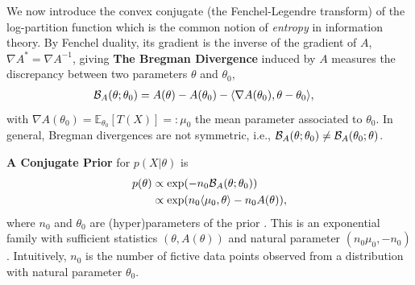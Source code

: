 \documentclass[twoside]{article}
\newcommand*{\expect}[2][]{\ensuremath{\mathbb{E}_{#1} \left[ #2 \right] }} %
\newcommand{\logpart}{A}
\newcommand{\conj}{{\logpart^*}}
\newcommand{\bregman}{\cB_\logpart}
\newcommand{\bregmanconj}{\cB_{\logpart^*}}
\newcommand{\nat}{\theta}
\newcommand{\m}{\mu}
\newcommand{\meanp}{\m}
\begin{document}
We now introduce the convex conjugate (the Fenchel-Legendre transform) of the log-partition function
\aligns{
	\conj(\m) =  \langle \m, \nat \rangle - \logpart(\nat)
	=  \max_{\nat'\in\Theta}  \langle \m, \nat' \rangle - \logpart(\nat')\; ,
}
which is the common notion of \textit{entropy} in information theory.
By Fenchel duality, its gradient is the inverse of the gradient of $\logpart$,  $\nabla\conj=\nabla\logpart^{-1}$, giving
\aligns{
	\nabla\conj \circ \nabla\logpart(\nat) = \nat, \quad \nabla\logpart\circ \nabla\conj(\meanp) = \meanp.
}
%
{\bf The Bregman Divergence} induced by $\logpart$ measures the discrepancy between two parameters $\nat$ and $\nat_0$,
\begin{align}
    \bregman (\nat ; \nat_0)
    & = \logpart(\nat) - \logpart(\nat_0)
    - \langle \nabla \logpart(\nat_0)  , \nat - \nat_0 \rangle,
    \label{eq:defBregman}
\end{align}
with $\nabla \logpart(\nat_0) = \expect[\nat_0]{T(X)} =: \meanp_0$ the mean parameter associated to $\nat_0$.
In general, Bregman divergences are not symmetric, i.e., $\bregman (\nat ; \nat_0)\neq \bregman (\nat_0 ; \nat)$.

{\bf A Conjugate Prior} for $p(X|\nat)$ is
\begin{align}
    p(\nat)
    &\propto \exp( - n_0 \bregman(\nat ; \nat_0) ) \nonumber \\
    &\propto \exp(n_0 \langle \m_0, \nat \rangle - n_0 \logpart(\nat)),
    \label{eq:def_prior}
\end{align}
where $n_0$ and $\nat_0$ are (hyper)parameters of the prior  \citep{agarwal2010geometric}.
This is an exponential family with sufficient statistics $(\nat ,\logpart(\nat))$ and natural parameter $(n_0 \m_0, -n_0)$.
Intuitively, $n_0$ is the number of fictive data points observed from a distribution with natural parameter $\nat_0$.
\end{document}
